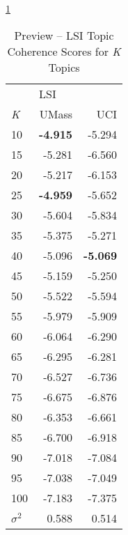 \documentclass[letterpaper,12pt]{article}
\begin{document}
\ref{tab:lsi_preview_tc}
\begin{table}
	\caption{\label{tab:lsi_preview_tc} Preview -- LSI Topic Coherence Scores for \emph{K} Topics}
	\begin{center}
		\begin{tabular}{lrr}
			\toprule
			{} & \multicolumn{2}{l}{LSI} \\
			\emph{K} &  UMass &    UCI \\
			\midrule
			10  & \textbf{-4.915} & -5.294 \\
			15  & -5.281 & -6.560 \\
			20  & -5.217 & -6.153 \\
			25  & \textbf{-4.959} & -5.652 \\
			30  & -5.604 & -5.834 \\
			35  & -5.375 & -5.271 \\
			40  & -5.096 & \textbf{-5.069} \\
			45  & -5.159 & -5.250 \\
			50  & -5.522 & -5.594 \\
			55  & -5.979 & -5.909 \\
			60  & -6.064 & -6.290 \\
			65  & -6.295 & -6.281 \\
			70  & -6.527 & -6.736 \\
			75  & -6.675 & -6.876 \\
			80  & -6.353 & -6.661 \\
			85  & -6.700 & -6.918 \\
			90  & -7.018 & -7.084 \\
			95  & -7.038 & -7.049 \\
			100 & -7.183 & -7.375 \\
			\midrule
			$\sigma^2$ & 0.588 & 0.514 \\
			\bottomrule
			\end{tabular}
	\end{center}
\end{table}
\end{document}
